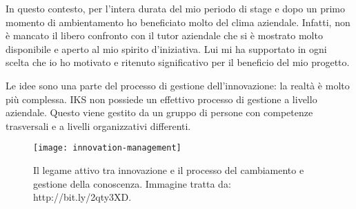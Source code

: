 In questo contesto, per l'intera durata del mio periodo di stage e dopo un primo momento di 
ambientamento ho beneficiato molto del clima aziendale. Infatti, non è mancato il libero 
confronto con il tutor aziendale che si è mostrato molto disponibile e aperto al mio spirito
d'iniziativa. Lui mi ha supportato in ogni scelta che io ho motivato e ritenuto significativo 
per il beneficio del mio progetto. 

Le idee sono una parte del processo di gestione dell'innovazione: la realtà è molto più 
complessa. IKS non possiede un effettivo processo di gestione a livello aziendale. Questo 
viene gestito da un gruppo di persone con competenze trasversali e a livelli organizzativi 
differenti. 

\begin{figure}[htbp]
   \begin{center}
	\texttt{[image: innovation-management]}
	\caption{Il legame attivo tra innovazione e il processo del cambiamento e gestione della conoscenza. Immagine tratta da: http://bit.ly/2qty3XD.}
   \end{center}
\end{figure}


\newpage 


%	
%	
%	
%	
%	



